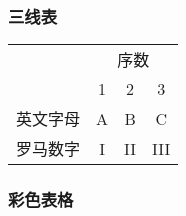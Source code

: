 \documentclass[twoside]{ctexart}
\begin{document}
        \subsubsection{三线表}
            \begin{tabular}{cccc}
                \toprule
                &\multicolumn{3}{c}{序数}\\
                \cmidrule(l{.25em}r){1-2}\cmidrule[.25ex](lr){3-4}
                &1&2&3\\
                \midrule
                英文字母&A&B&C\\
                罗马数字&I&II&III\\
                \bottomrule
            \end{tabular}

        \subsubsection{彩色表格}
\end{document}
